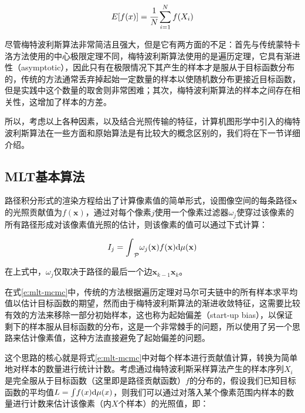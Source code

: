 \begin{equation}\label{e:mlt-mcmc}
	E[f(x)]= \cfrac{1}{N}\sum^{N}_{i=1}f({X}_i)
\end{equation}

尽管梅特波利斯算法非常简洁且强大，但是它有两方面的不足：首先与传统蒙特卡洛方法使用的中心极限定理不同，梅特波利斯算法使用的是遍历定理，它具有渐进性（asymptotic），因此只有在极限情况下其产生的样本才是服从于目标函数分布的，传统的方法通常丢弃掉起始一定数量的样本以使随机数分布更接近目标函数，但是实践中这个数量的取舍则非常困难；其次，梅特波利斯算法的样本之间存在相关性，这增加了样本的方差。

所以，考虑以上各种因素，以及结合光照传输的特征，计算机图形学中引入的梅特波利斯算法在一些方面和原始算法是有比较大的概念区别的，我们将在下一节详细介绍。




\subsection{MLT基本算法}\label{sec:mlt-algorithm}
路径积分形式的渲染方程给出了计算像素值的简单形式，设图像空间的每条路径${\mathbf{x}}$的光照贡献值为$f({\mathbf{x}})$，通过对每个像素$j$使用一个像素过滤器$\omega_j$使穿过该像素的所有路径形成对该像素值光照的估计，则该像素的值可以通过下式计算：

\begin{equation}
	I_j={\rm \int}_{\mathcal{P}}\omega_j({\mathbf{x}})f({\mathbf{x}}){\rm d}\mu({\mathbf{x}})
\end{equation}

\noindent 在上式中，$\omega_j$仅取决于路径的最后一个边$\mathbf{x}_{k-1}\mathbf{x}_{k}$。

在式\ref{e:mlt-mcmc}中，传统的方法根据遍历定理对马尔可夫链中的所有样本求平均值以估计目标函数的期望，然而由于梅特波利斯算法的渐进收敛特征，这需要比较有效的方法来移除一部分初始样本，这也称为起始偏差（start-up bias），以保证剩下的样本服从目标函数的分布，这是一个非常棘手的问题，所以\cite{a:MetropolisLightTransport}使用了另一个思路来估计像素值，这种方法直接避免了起始偏差的问题。

这个思路的核心就是将式\ref{e:mlt-mcmc}中对每个样本进行贡献值计算，转换为简单地对样本的数量进行统计计数。考虑通过梅特波利斯采样算法产生的样本序列${X}_i$是完全服从于目标函数（这里即是路径贡献函数）$f$的分布的，假设我们已知目标函数的平均值${L}={\rm \int} f({x}){\rm d}\mu({x})$，则我们可以通过对落入某个像素范围内样本的数量进行计数来估计该像素（内$X$个样本）的光照值，即：

